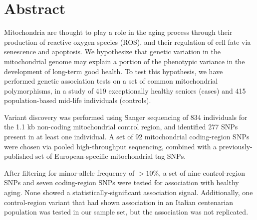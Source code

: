 
\chapter{Abstract}

Mitochondria are thought to play a role in the aging process through their production of reactive oxygen species (ROS), and their regulation of cell fate via senescence and apoptosis.  We hypothesize that genetic variation in the mitochondrial genome may explain a portion of the phenotypic variance in the development of long-term good health.  To test this hypothesis, we have performed genetic association tests on a set of common mitochondrial polymorphisms, in a study of 419 exceptionally healthy seniors (cases) and 415 population-based mid-life individuals (controls).

Variant discovery was performed using Sanger sequencing of 834 individuals for the 1.1 kb non-coding mitochondrial control region, and identified 277 SNPs present in at least one individual.  A set of 92 mitochondrial coding-region SNPs were chosen via pooled high-throughput sequencing, combined with a previously-published set of European-specific mitochondrial tag SNPs.

After filtering for minor-allele frequency of $> 10\%$, a set of nine control-region SNPs and seven coding-region SNPs were tested for association with healthy aging.  None showed a statistically-significant association signal.  Additionally, one control-region variant that had shown association in an Italian centenarian population was tested in our sample set, but the association was not replicated.


